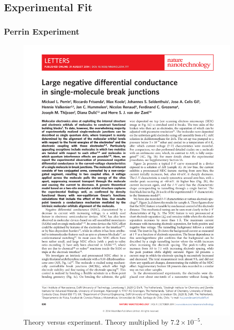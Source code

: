 \subsection*{Experimental Fit}
\begin{frame}
    \frametitle{Perrin Experiment}
    \vspace{-3mm}
    \begin{figure}[!b] 
        \centering
        \includegraphics[height=.75\textheight, width=\textwidth, page=4, clip=true, trim=11.5cm 8.5cm 4.5cm 15cm]{nature.pdf}
        \vspace{-6mm}
        \caption{Theory versus experiment\cite{perrin}. Theory multiplied by $7.2\times 10^{-5}$.}
    \end{figure} 
\end{frame}
